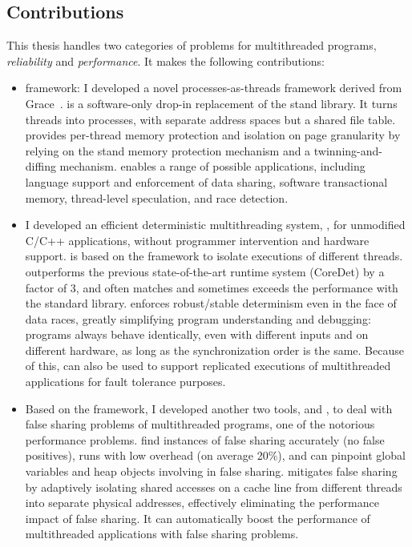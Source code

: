 \subsection*{Contributions}

This thesis handles two categories of problems for multithreaded programs, {\it reliability} and {\it performance}. It makes the following contributions:

\begin{itemize}
\item \Sheriff{} framework: I developed a novel processes-as-threads framework derived from Grace~\cite{grace}. \sheriff{} is a software-only drop-in replacement of the stand \pthreads{} library. It turns threads into processes, with separate address spaces but a shared file table. \sheriff{} provides per-thread memory protection and isolation on page granularity by relying on the stand memory protection mechanism and a twinning-and-diffing mechanism. \sheriff{} enables a range of possible applications, including language support and enforcement of data sharing, software transactional memory, thread-level speculation, and race detection. 

\item I developed an efficient deterministic multithreading system, \dthreads{}, for unmodified C/C++ applications,  without programmer intervention and hardware support. \dthreads{} is based on the \sheriff{} framework to isolate executions of different threads. \dthreads{} outperforms the previous state-of-the-art runtime system (CoreDet) by a factor of 3, and often matches and sometimes exceeds the performance with the standard \pthreads{} library. \Dthreads{} enforces robust/stable determinism even in the face of data races, greatly simplifying program understanding and debugging: programs always behave identically, even with different inputs and on different hardware, as long as the synchronization order is the same. Because of this, \dthreads{} can also be used to support replicated executions of multithreaded applications for fault tolerance purposes.

\item 
Based on the \sheriff{} framework, I developed another two tools, \SheriffDetect{} and \SheriffProtect{}, to deal with false sharing problems of multithreaded programs, one of the notorious performance problems. 
\SheriffDetect{} find instances of false sharing accurately (no false positives), runs with low overhead (on average 20\%), and can pinpoint global variables and heap objects involving in false sharing. \SheriffProtect{} mitigates false sharing by adaptively isolating shared accesses on a cache line from different threads into separate physical addresses, effectively eliminating the performance impact of false sharing. It can automatically boost the performance of multithreaded applications with false sharing problems. 


\end{itemize}
